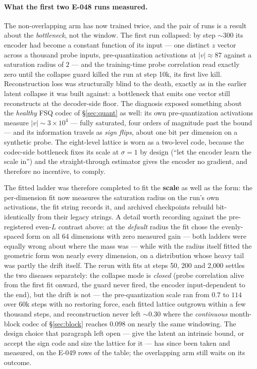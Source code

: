 \documentclass[10pt]{article}
\begin{document}
\paragraph{What the first two E-048 runs measured.} The non-overlapping arm
has now trained twice, and the pair of runs is a result about the
\emph{bottleneck}, not the window. The first run collapsed: by step
${\sim}300$ its encoder had become a constant function of its input --- one
distinct $z$ vector across a thousand probe inputs, pre-quantization
activations at $|v|\approx 87$ against a saturation radius of $2$ --- and
the training-time probe correlation read exactly zero until the collapse
guard killed the run at step 10k, its first live kill. Reconstruction loss
was structurally blind to the death, exactly as in the earlier latent
collapse it was built against: a bottleneck that emits one vector still
reconstructs at the decoder-side floor. The diagnosis exposed something
about the \emph{healthy} FSQ codec of \S\ref{sec:quant} as well: its own
pre-quantization activations measure $|v|\sim 3{\times}10^{4}$ --- fully
saturated, four orders of magnitude past the bound --- and its information
travels as \emph{sign flips}, about one bit per dimension on a synthetic
probe. The eight-level lattice is worn as a two-level code, because the
codec-side bottleneck fixes its scale at $\sigma{=}1$ by design (``let the
encoder learn the scale in'') and the straight-through estimator gives the
encoder no gradient, and therefore no incentive, to comply.

The fitted ladder was therefore completed to fit the \textbf{scale} as well
as the form: the per-dimension fit now measures the saturation radius on
the run's own activations, the fit string records it, and archived
checkpoints rebuild bit-identically from their legacy strings. A detail
worth recording against the pre-registered even-$L$ contrast above: at the
\emph{default} radius the fit chose the evenly-spaced form on all 64
dimensions with zero measured gain --- both ladders were equally wrong
about where the mass was --- while with the radius itself fitted the
geometric form won nearly every dimension, on a distribution whose heavy
tail was partly the drift itself. The rerun with fits at steps 50, 200 and
2{,}000 settles the two diseases separately: the collapse mode is
\emph{closed} (probe correlation alive from the first fit onward, the
guard never fired, the encoder input-dependent to the end), but the drift
is not --- the pre-quantization scale ran from $0.7$ to $114$ over 60k
steps with no restoring force, each fitted lattice outgrown within a few
thousand steps, and reconstruction never left ${\sim}0.30$ where the
\emph{continuous} month-block codec of \S\ref{sec:block} reaches $0.098$
on nearly the same windowing. The design choice that paragraph left open
--- give the latent an intrinsic bound, or accept the sign code and size
the lattice for it --- has since been taken and measured, on the E-049
rows of the table; the overlapping arm still waits on its outcome.
\end{document}
